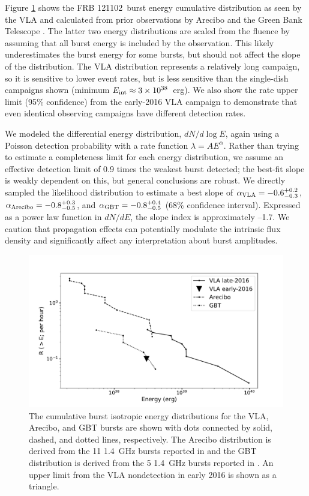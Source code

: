 \documentclass[twocolumn]{aastex61}
\newcommand{\frb}{FRB 121102}
\begin{document}
Figure \ref{fig:ed} shows the \frb\ burst energy cumulative distribution as seen by the VLA and calculated from prior observations by Arecibo and the Green Bank Telescope \citep{2016Natur.531..202S, 2016arXiv160308880S}. The latter two energy distributions are scaled from the fluence by assuming that all burst energy is included by the observation. This likely underestimates the burst energy for some bursts, but should not affect the slope of the distribution. The VLA distribution represents a relatively long campaign, so it is sensitive to lower event rates, but is less sensitive than the single-dish campaigns shown (minimum $E_{\rm{int}}\approx3\times10^{38}$\ erg). We also show the rate upper limit (95\% confidence) from the early-2016 VLA campaign to demonstrate that even identical observing campaigns have different detection rates.

We modeled the differential energy distribution, $dN/d\log{E}$, again using a Poisson detection probability with a rate function $\lambda = A E^{\alpha}$. Rather than trying to estimate a completeness limit for each energy distribution, we assume an effective detection limit of 0.9 times the weakest burst detected; the best-fit slope is weakly dependent on this, but general conclusions are robust. We directly sampled the likelihood distribution to estimate a best slope of $\alpha_{\rm{VLA}}=-0.6^{+0.2}_{-0.3}$, $\alpha_{\rm{Arecibo}}=-0.8^{+0.3}_{-0.5}$, and $\alpha_{\rm{GBT}}=-0.8^{+0.4}_{-0.5}$ (68\% confidence interval). Expressed as a power law function in $dN/dE$, the slope index is approximately --1.7. We caution that propagation effects can potentially modulate the intrinsic flux density and significantly affect any interpretation about burst amplitudes. 

\begin{figure}[htb]
\begin{center}
\includegraphics[width=2\columnwidth]{energy_disn.pdf}
\caption{The cumulative burst isotropic energy distributions for the VLA, Arecibo, and GBT bursts are shown with dots connected by solid, dashed, and dotted lines, respectively. The Arecibo distribution is derived from the 11 1.4~GHz bursts reported in \citet{2016Natur.531..202S} and the GBT distribution is derived from the 5 1.4~GHz bursts reported in \citet{2016arXiv160308880S}. An upper limit from the VLA nondetection in early 2016 is shown as a triangle. \label{fig:ed}}
\end{center}
\end{figure}
\end{document}
